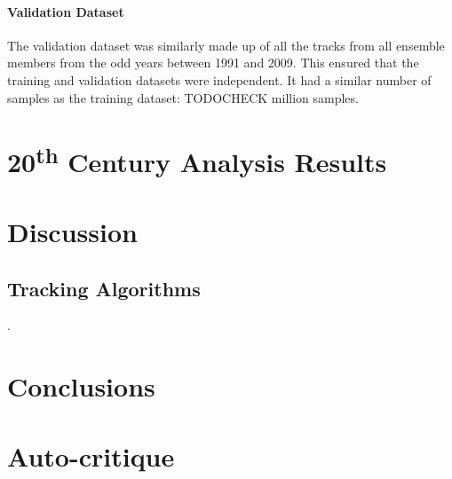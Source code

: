 \documentclass[pdftex,12pt,a4paper]{report}
\newcommand{\ts}{\textsuperscript}
\begin{document}
\subsubsection{Validation Dataset} The validation dataset was similarly made up of all the tracks
from all ensemble members from the odd years between 1991 and 2009. This ensured that the training
and validation datasets were independent. It had a similar number of samples as the training
dataset: TODOCHECK million samples.

\chapter{20\ts{th} Century Analysis Results}
\label{chap:results_analysis}

\chapter{Discussion}
\label{chap:discussion}

\section{Tracking Algorithms}
\label{sec:discussion_tracking_algs}.

\chapter{Conclusions}
\label{chap:conclusion}

\chapter*{Auto-critique}

\printbibliography[title={References}]

\end{document}
